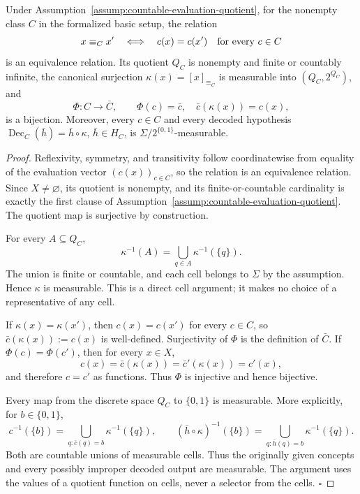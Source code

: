 \begin{proposition}\label{prop:step-002-factorization}
Under Assumption~\ref{assump:countable-evaluation-quotient}, for the nonempty
class \(C\) in the formalized basic setup, the relation
\[
x\equiv_Cx'\quad\Longleftrightarrow\quad
c(x)=c(x')\quad\hbox{for every }c\in C
\]
is an equivalence relation. Its quotient \(Q_C\) is nonempty and finite or
countably infinite, the canonical surjection
\(\kappa(x)=[x]_{\equiv_C}\) is measurable into \((Q_C,2^{Q_C})\), and
\[
\Phi:C\longrightarrow\bar C,\qquad \Phi(c)=\bar c,
\quad \bar c(\kappa(x))=c(x),
\]
is a bijection. Moreover, every \(c\in C\) and every decoded hypothesis
\(\operatorname{Dec}_C(\bar h)=\bar h\circ\kappa\),
\(\bar h\in H_C\), is \(\Sigma/2^{\{0,1\}}\)-measurable.


\end{proposition}

\begin{proof}
Reflexivity, symmetry, and transitivity follow coordinatewise from
equality of the evaluation vector \((c(x))_{c\in C}\), so the relation is an
equivalence relation. Since \(X\ne\varnothing\), its quotient is nonempty,
and its finite-or-countable cardinality is exactly the first clause of
Assumption~\ref{assump:countable-evaluation-quotient}. The quotient map is
surjective by construction.

For every \(A\subseteq Q_C\),
\[
\kappa^{-1}(A)=\bigcup_{q\in A}\kappa^{-1}(\{q\}).
\tag{1}
\]
The union is finite or countable, and each cell belongs to \(\Sigma\) by the
assumption. Hence \(\kappa\) is measurable. This is a direct cell argument;
it makes no choice of a representative of any cell.

If \(\kappa(x)=\kappa(x')\), then \(c(x)=c(x')\) for every \(c\in C\), so
\(\bar c(\kappa(x)):=c(x)\) is well-defined. Surjectivity of \(\Phi\) is the
definition of \(\bar C\). If \(\Phi(c)=\Phi(c')\), then for every \(x\in X\),
\[
c(x)=\bar c(\kappa(x))=\bar c'(\kappa(x))=c'(x),
\]
and therefore \(c=c'\) as functions. Thus \(\Phi\) is injective and hence
bijective.

Every map from the discrete space \(Q_C\) to \(\{0,1\}\) is measurable. More
explicitly, for \(b\in\{0,1\}\),
\[
c^{-1}(\{b\})
=\bigcup_{q:\bar c(q)=b}\kappa^{-1}(\{q\}),
\qquad
(\bar h\circ\kappa)^{-1}(\{b\})
=\bigcup_{q:\bar h(q)=b}\kappa^{-1}(\{q\}).
\tag{2}
\]
Both are countable unions of measurable cells. Thus the originally given
concepts and every possibly improper decoded output are measurable. The
argument uses the values of a quotient function on cells, never a selector
from the cells. \(\square\)


\end{proof}

